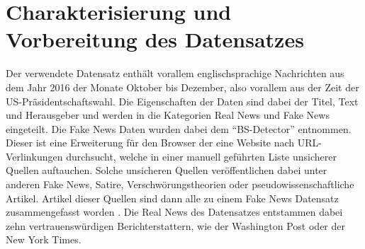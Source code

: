 \section{Charakterisierung und Vorbereitung des Datensatzes}
Der verwendete Datensatz \cite{real_data} enthält vorallem englischsprachige Nachrichten aus dem Jahr 
2016 der Monate Oktober bis Dezember, also vorallem aus der Zeit der US-Präsidentschaftswahl.
Die Eigenschaften der Daten sind dabei der Titel, Text und Herausgeber und werden in die Kategorien 
Real News und Fake News eingeteilt. Die Fake News Daten wurden dabei dem 
\enquote{BS-Detector} \cite{BS} entnommen. Dieser ist eine Erweiterung für den Browser 
der eine Website nach URL-Verlinkungen durchsucht, welche in einer manuell geführten 
Liste unsicherer Quellen auftauchen. Solche unsicheren Quellen veröffentlichen dabei unter anderen 
Fake News, Satire, Verschwörungstheorien oder pseudowissenschaftliche Artikel. Artikel dieser Quellen 
sind dann alle zu einem Fake News Datensatz zusammengefasst worden \cite{fake_data}. Die 
Real News des Datensatzes entstammen dabei zehn vertrauenswürdigen Berichterstattern, wie der 
Washington Post oder der New York Times.